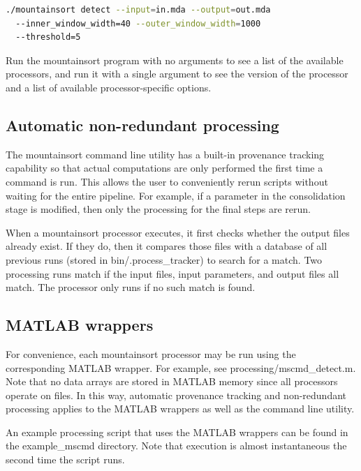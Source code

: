 \documentclass[hidelinks,10pt]{article}
\begin{document}
\begin{lstlisting}[language=bash]
./mountainsort detect --input=in.mda --output=out.mda
  --inner_window_width=40 --outer_window_width=1000
  --threshold=5
\end{lstlisting}

Run the mountainsort program with no arguments to see a list of the available processors, and run it with a single argument to see the version of the processor and a list of available processor-specific options.

\subsection {Automatic non-redundant processing}

The mountainsort command line utility has a built-in provenance tracking capability so that actual computations are only performed the first time a command is run. This allows the user to conveniently rerun scripts without waiting for the entire pipeline. For example, if a parameter in the consolidation stage is modified, then only the processing for the final steps are rerun.

When a mountainsort processor executes, it first checks whether the output files already exist. If they do, then it compares those files with a database of all previous runs (stored in bin/.process\_tracker) to search for a match. Two processing runs match if the input files, input parameters, and output files all match. The processor only runs if no such match is found.

\subsection {MATLAB wrappers}

For convenience, each mountainsort processor may be run using the corresponding MATLAB wrapper. For example, see processing/mscmd\_detect.m. Note that no data arrays are stored in MATLAB memory since all processors operate on files. In this way, automatic provenance tracking and non-redundant processing applies to the MATLAB wrappers as well as the command line utility.

An example processing script that uses the MATLAB wrappers can be found in the example\_mscmd directory. Note that execution is almost instantaneous the second time the script runs.
\end{document}
